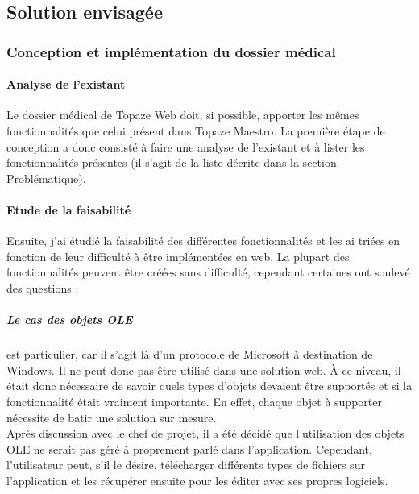 \subsection{Solution envisagée}
\subsubsection{Conception et implémentation du dossier médical}

\paragraph{Analyse de l'existant\\}
Le dossier médical de Topaze Web doit, si possible, apporter les mêmes fonctionnalités que celui présent dans Topaze Maestro.
La première étape de conception a donc consisté à faire une analyse de l’existant et à lister les fonctionnalités présentes (il s’agit de la liste décrite dans la section Problématique).

\paragraph{Etude de la faisabilité\\}
Ensuite, j'ai étudié la faisabilité des différentes fonctionnalités et les ai triées en fonction de leur difficulté à être implémentées en web. La plupart des fonctionnalités peuvent être créées sans difficulté, cependant certaines ont soulevé des questions :

\subparagraph*{Le cas des objets OLE} est particulier, car il s'agit là d'un protocole de Microsoft à destination de Windows. 
Il ne peut donc pas être utilisé dans une solution web. À ce niveau, il était donc nécessaire de savoir quels types d'objets devaient être supportés et si la fonctionnalité était vraiment importante. En effet, chaque objet à supporter nécessite de batir une solution sur mesure.\\
Après discussion avec le chef de projet, il a été décidé que l'utilisation des objets OLE ne serait pas géré à proprement parlé dans l'application. Cependant, l'utilisateur peut, s'il le désire, télécharger différents types de fichiers sur l'application et les récupérer ensuite pour les éditer avec ses propres logiciels.

